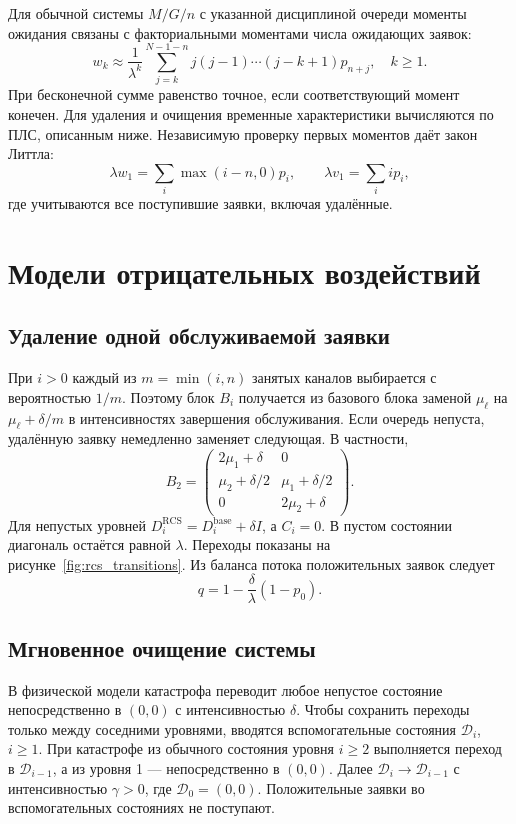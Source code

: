\documentclass[a4paper,12pt]{article}
\begin{document}
Для обычной системы \(M/G/n\) с указанной дисциплиной очереди моменты ожидания связаны с факториальными моментами числа ожидающих заявок:
\[
w_k\approx\frac{1}{\lambda^k}\sum_{j=k}^{N-1-n}j(j-1)\cdots(j-k+1)p_{n+j},\quad k\ge1.
\]
При бесконечной сумме равенство точное, если соответствующий момент конечен. Для удаления и очищения временные характеристики вычисляются по ПЛС, описанным ниже. Независимую проверку первых моментов даёт закон Литтла:
\[
\lambda w_1=\sum_i\max(i-n,0)p_i,\qquad
\lambda v_1=\sum_i i p_i,
\]
где учитываются все поступившие заявки, включая удалённые.

\section{Модели отрицательных воздействий}
\subsection{Удаление одной обслуживаемой заявки}
При \(i>0\) каждый из \(m=\min(i,n)\) занятых каналов выбирается с вероятностью \(1/m.\) Поэтому блок \(B_i\) получается из базового блока заменой \(\mu_\ell\) на \(\mu_\ell+\delta/m\) в интенсивностях завершения обслуживания. Если очередь непуста, удалённую заявку немедленно заменяет следующая. В частности,
\[
B_2=\begin{pmatrix}2\mu_1+\delta&0\\\mu_2+\delta/2&\mu_1+\delta/2\\0&2\mu_2+\delta\end{pmatrix}.
\]
Для непустых уровней \(D_i^{\mathrm{RCS}}=D_i^{\mathrm{base}}+\delta I\), а \(C_i=0.\) В пустом состоянии диагональ остаётся равной \(\lambda.\) Переходы показаны на рисунке~\ref{fig:rcs_transitions}. Из баланса потока положительных заявок следует
\[
q=1-\frac{\delta}{\lambda}(1-p_0).
\]

\subsection{Мгновенное очищение системы}
В физической модели катастрофа переводит любое непустое состояние непосредственно в \((0,0)\) с интенсивностью \(\delta.\) Чтобы сохранить переходы только между соседними уровнями, вводятся вспомогательные состояния \(\mathcal{D}_i\), \(i\ge1.\) При катастрофе из обычного состояния уровня \(i\ge2\) выполняется переход в \(\mathcal{D}_{i-1}\), а из уровня 1 --- непосредственно в \((0,0).\) Далее \(\mathcal{D}_i\to \mathcal{D}_{i-1}\) с интенсивностью \(\gamma>0\), где \(\mathcal{D}_0=(0,0).\) Положительные заявки во вспомогательных состояниях не поступают.
\end{document}
